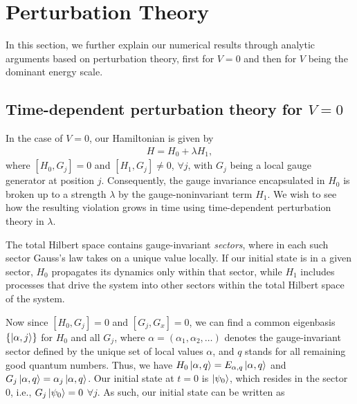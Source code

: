 \documentclass[aps,prl,reprint,twocolumn,superscriptaddress,floatfix,nofootinbib]{revtex4-1}
\begin{document}
\section{Perturbation Theory}
\noindent In this section, we further explain our numerical results through analytic arguments based on perturbation theory, first for $V=0$ and then for $V$ being the dominant energy scale. 

\subsection{Time-dependent perturbation theory for $V=0$}
In the case of $V=0$, our Hamiltonian is given by
\begin{align}\label{eq:H_unprotected}
H=H_0+\lambda H_1,
\end{align}
where $[H_0,G_j]=0$ and $[H_1,G_j]\neq0$, $\forall j$, with $G_j$ being a local gauge generator at position $j$. Consequently, the gauge invariance encapsulated in $H_0$ is broken up to a strength $\lambda$ by the gauge-noninvariant term $H_1$. We wish to see how the resulting violation grows in time using time-dependent perturbation theory in $\lambda$. 

The total Hilbert space contains gauge-invariant \textit{sectors}, where in each such sector Gauss's law takes on a unique value locally. If our initial state is in a given sector, $H_0$ propagates its dynamics only within that sector, while $H_1$ includes processes that drive the system into other sectors within the total Hilbert space of the system. 

Now since $[H_0,G_j]=0$ and $[G_j,G_x]=0$, we can find a common eigenbasis $\{\ket{\alpha,j}\}$ for $H_0$ and all $G_j$, where $\alpha=(\alpha_1,\alpha_2,\ldots)$ denotes the gauge-invariant sector defined by the unique set of local values $\alpha$, and $q$ stands for all remaining good quantum numbers. Thus, we have $H_0\ket{\alpha,q}=E_{\alpha,q}\ket{\alpha,q}$ and $G_j\ket{\alpha,q}=\alpha_j\ket{\alpha,q}$. Our initial state at $t=0$ is $\ket{\psi_0}$, which resides in the sector $0$, i.e., $G_j\ket{\psi_0}=0$ $\forall j$. As such, our initial state can be written as
\end{document}
